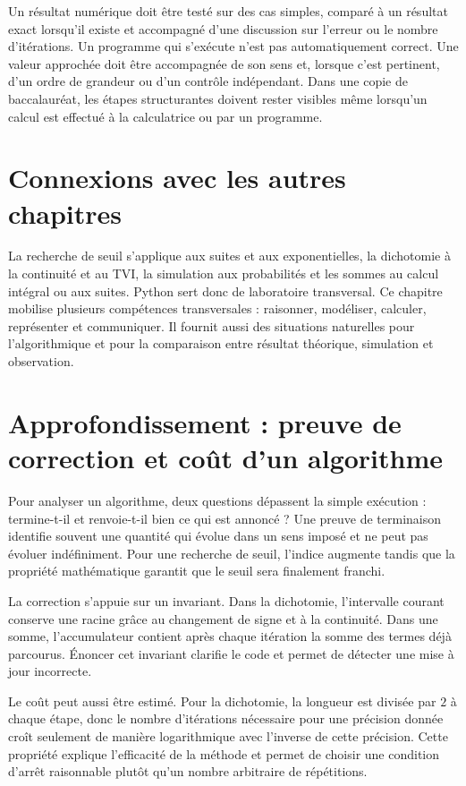 Un résultat numérique doit être testé sur des cas simples, comparé à un résultat exact lorsqu’il existe et accompagné d’une discussion sur l’erreur ou le nombre d’itérations. Un programme qui s’exécute n’est pas automatiquement correct.
Une valeur approchée doit être accompagnée de son sens et, lorsque c’est pertinent, d’un ordre de grandeur ou d’un contrôle indépendant. Dans une copie de baccalauréat, les étapes structurantes doivent rester visibles même lorsqu’un calcul est effectué à la calculatrice ou par un programme.

\section{Connexions avec les autres chapitres}
La recherche de seuil s’applique aux suites et aux exponentielles, la dichotomie à la continuité et au TVI, la simulation aux probabilités et les sommes au calcul intégral ou aux suites. Python sert donc de laboratoire transversal.
Ce chapitre mobilise plusieurs compétences transversales : raisonner, modéliser, calculer, représenter et communiquer. Il fournit aussi des situations naturelles pour l’algorithmique et pour la comparaison entre résultat théorique, simulation et observation.

\section{Approfondissement : preuve de correction et coût d’un algorithme}
Pour analyser un algorithme, deux questions dépassent la simple exécution : termine-t-il et renvoie-t-il bien ce qui est annoncé ? Une preuve de terminaison identifie souvent une quantité qui évolue dans un sens imposé et ne peut pas évoluer indéfiniment. Pour une recherche de seuil, l’indice augmente tandis que la propriété mathématique garantit que le seuil sera finalement franchi.

La correction s’appuie sur un invariant. Dans la dichotomie, l’intervalle courant conserve une racine grâce au changement de signe et à la continuité. Dans une somme, l’accumulateur contient après chaque itération la somme des termes déjà parcourus. Énoncer cet invariant clarifie le code et permet de détecter une mise à jour incorrecte.

Le coût peut aussi être estimé. Pour la dichotomie, la longueur est divisée par $2$ à chaque étape, donc le nombre d’itérations nécessaire pour une précision donnée croît seulement de manière logarithmique avec l’inverse de cette précision. Cette propriété explique l’efficacité de la méthode et permet de choisir une condition d’arrêt raisonnable plutôt qu’un nombre arbitraire de répétitions.

